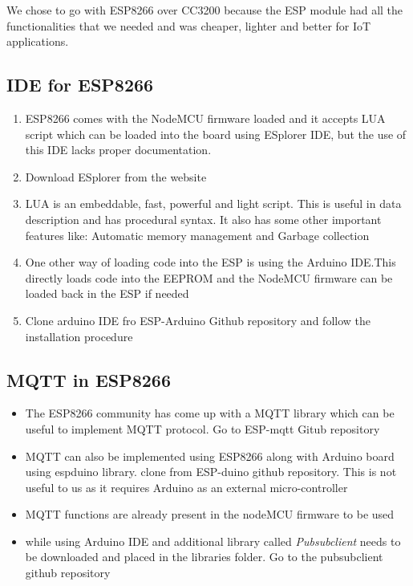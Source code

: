 \documentclass[16pt]{article}
\begin{document}
We chose to go with ESP8266 over CC3200 because the ESP module had all
the functionalities that we needed and was cheaper, lighter and better
for IoT applications.

\vspace{5.5cm}

\subsection{IDE for ESP8266}

\begin{enumerate}

\item
  ESP8266 comes with the NodeMCU firmware loaded and it accepts LUA
  script which can be loaded into the board using ESplorer IDE, but the
  use of this IDE lacks proper documentation.
\item
  Download ESplorer from the website 
\item
  LUA is an embeddable, fast, powerful and light script. This is useful in data
  description and has procedural syntax. It also has some other
  important features like: Automatic memory management and Garbage
  collection
\item
  One other way of loading code into the ESP is using the Arduino
  IDE.This directly loads code into the EEPROM and the NodeMCU firmware
  can be loaded back in the ESP if
  needed
\item Clone
  arduino IDE fro ESP-Arduino Github repository and follow
  the installation procedure
\end{enumerate}




\vspace{0.5cm}

\subsection{MQTT in ESP8266}

\begin{itemize}

\item
  The ESP8266 community has come up with a MQTT library which can be
  useful to implement MQTT protocol. Go to ESP-mqtt Gitub repository
 
\item
  MQTT can also be implemented using ESP8266 along with Arduino board
  using espduino library. clone from ESP-duino github repository. This is not
  useful to us as it requires Arduino as an external micro-controller
\item
  MQTT functions are already present in the nodeMCU firmware to be used
\item
  while using Arduino IDE and additional library called
  \emph{Pubsubclient} needs to be downloaded and placed in the libraries
  folder. Go to the pubsubclient github repository
\end{itemize}
\end{document}
